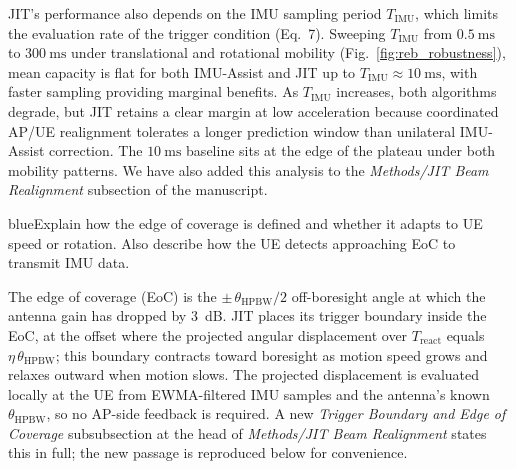 \documentclass{article}
\newcommand{\blue}[1]{\begin{color}{blue}#1\end{color}}
\begin{document}
\noindent JIT's performance also depends on the IMU sampling period $T_{\text{IMU}}$, which limits the evaluation rate of the trigger condition (Eq.~7). Sweeping $T_{\text{IMU}}$ from $\SI{0.5}{\milli\second}$ to $\SI{300}{\milli\second}$ under translational and rotational mobility (Fig.~\ref{fig:reb_robustness}), mean capacity is flat for both IMU-Assist and JIT up to $T_{\text{IMU}} \approx \SI{10}{\milli\second}$, with faster sampling providing marginal benefits. As $T_{\text{IMU}}$ increases, both algorithms degrade, but JIT retains a clear margin at low acceleration because coordinated AP/UE realignment tolerates a longer prediction window than unilateral IMU-Assist correction. The $\SI{10}{\milli\second}$ baseline sits at the edge of the plateau under both mobility patterns. We have also added this analysis to the \emph{Methods/JIT Beam Realignment} subsection of the manuscript.


\begin{tcbremark}
{\selectfont
\blue{Explain how the edge of coverage is defined and whether it adapts to UE speed or rotation. Also describe how the UE detects approaching EoC to transmit IMU data.}
}
\end{tcbremark}

\noindent The edge of coverage (EoC) is the $\pm\,\theta_{\text{HPBW}}/2$ off-boresight angle at which the antenna gain has dropped by \SI{3}{\deci\bel}. JIT places its trigger boundary inside the EoC, at the offset where the projected angular displacement over $T_{\text{react}}$ equals $\eta\,\theta_{\text{HPBW}}$; this boundary contracts toward boresight as motion speed grows and relaxes outward when motion slows. The projected displacement is evaluated locally at the UE from EWMA-filtered IMU samples and the antenna's known $\theta_{\text{HPBW}}$, so no AP-side feedback is required. A new \emph{Trigger Boundary and Edge of Coverage} subsubsection at the head of \emph{Methods/JIT Beam Realignment} states this in full; the new passage is reproduced below for convenience.
\end{document}
